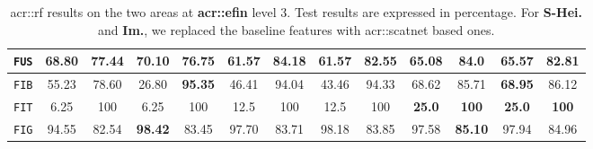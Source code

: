 \begin{table}[htpb]
\begin{center}
\begin{tabular}{| c | c c | c c | c c | c c | c c | c c |}
                        \hline
                        \texttt{FUS} & 68.80 & 77.44 & \textbf{70.10} & 76.75 & 61.57 & \textbf{84.18} & 61.57 & 82.55 & 65.08 & 84.0 & 65.57 & 82.81 \\
                        \hline
                        \texttt{FIB} & 55.23 & 78.60 & 26.80 & \textbf{95.35} & 46.41 & 94.04 & 43.46 & 94.33 & 68.62 & 85.71 & \textbf{68.95} & 86.12 \\
                        \hline
                        \texttt{FIT} & 6.25 & 100 & 6.25 & 100 & 12.5 & 100 & 12.5 & 100 & \textbf{25.0} & \textbf{100} & \textbf{25.0} & \textbf{100} \\
                        \hline
                        \texttt{FIG} & 94.55 & 82.54 & \textbf{98.42} & 83.45 & 97.70 & 83.71 & 98.18 & 83.85 & 97.58 & \textbf{85.10} & 97.94 & 84.96 \\
                        \hline
                    \end{tabular}
                \end{center}
                \caption{
                    \label{tab::stats_scat_pca_rf_f3}
                    \gls{acr::rf} results on the two areas at \textbf{\gls{acr::efin}} level 3.
                    Test results are expressed in percentage.
                    For \textbf{S-Hei.} and \textbf{Im.}, we replaced the baseline features with \gls{acr::scatnet} based ones.
                }
            \end{table}
